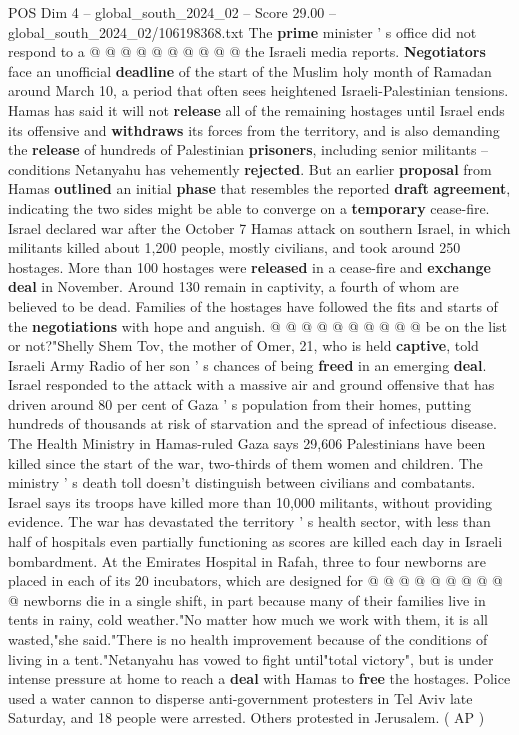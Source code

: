 \begin{textsample}{POS Dim 4 – global\_south\_2024\_02 – Score 29.00 – global\_south\_2024\_02/106198368.txt}
The \textbf{prime} minister ' s office did not respond to a @ @ @ @ @ @ @ @ @ @ the Israeli media reports. \textbf{Negotiators} face an unofficial \textbf{deadline} of the start of the Muslim holy month of Ramadan around March 10, a period that often sees heightened Israeli-Palestinian tensions.
Hamas has said it will not \textbf{release} all of the remaining hostages until Israel ends its offensive and \textbf{withdraws} its forces from the territory, and is also demanding the \textbf{release} of hundreds of Palestinian \textbf{prisoners}, including senior militants -- conditions Netanyahu has vehemently \textbf{rejected}.
But an earlier \textbf{proposal} from Hamas \textbf{outlined} an initial \textbf{phase} that resembles the reported \textbf{draft} \textbf{agreement}, indicating the two sides might be able to converge on a \textbf{temporary} cease-fire.
Israel declared war after the October 7 Hamas attack on southern Israel, in which militants killed about 1,200 people, mostly civilians, and took around 250 hostages.
More than 100 hostages were \textbf{released} in a cease-fire and \textbf{exchange} \textbf{deal} in November.
Around 130 remain in captivity, a fourth of whom are believed to be dead.
Families of the hostages have followed the fits and starts of the \textbf{negotiations} with hope and anguish. @ @ @ @ @ @ @ @ @ @ be on the list or not?"Shelly Shem Tov, the mother of Omer, 21, who is held \textbf{captive}, told Israeli Army Radio of her son ' s chances of being \textbf{freed} in an emerging \textbf{deal}.
Israel responded to the attack with a massive air and ground offensive that has driven around 80 per cent of Gaza ' s population from their homes, putting hundreds of thousands at risk of starvation and the spread of infectious disease.
The Health Ministry in Hamas-ruled Gaza says 29,606 Palestinians have been killed since the start of the war, two-thirds of them women and children.
The ministry ' s death toll doesn't distinguish between civilians and combatants.
Israel says its troops have killed more than 10,000 militants, without providing evidence.
The war has devastated the territory ' s health sector, with less than half of hospitals even partially functioning as scores are killed each day in Israeli bombardment.
At the Emirates Hospital in Rafah, three to four newborns are placed in each of its 20 incubators, which are designed for @ @ @ @ @ @ @ @ @ @ newborns die in a single shift, in part because many of their families live in tents in rainy, cold weather."No matter how much we work with them, it is all wasted,"she said."There is no health improvement because of the conditions of living in a tent."Netanyahu has vowed to fight until"total victory", but is under intense pressure at home to reach a \textbf{deal} with Hamas to \textbf{free} the hostages.
Police used a water cannon to disperse anti-government protesters in Tel Aviv late Saturday, and 18 people were arrested.
Others protested in Jerusalem. ( AP )


\end{textsample}
